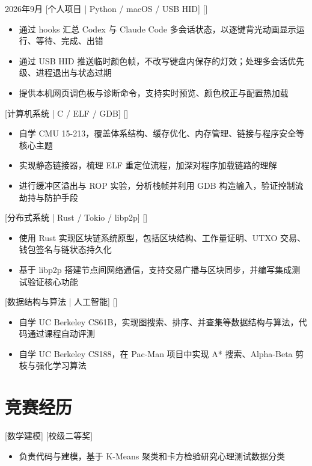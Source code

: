 \documentclass{cv}
\begin{document}
  {2026年9月}
  [个人项目 | Python / macOS / USB HID]
  []
  \begin{itemize}
    \item 通过 hooks 汇总 Codex 与 Claude Code 多会话状态，以逐键背光动画显示运行、等待、完成、出错
    \item 通过 USB HID 推送临时颜色帧，不改写键盘内保存的灯效；处理多会话优先级、进程退出与状态过期
    \item 提供本机网页调色板与诊断命令，支持实时预览、颜色校正与配置热加载
  \end{itemize}

  {}
  [计算机系统 | C / ELF / GDB]
  []
  \begin{itemize}
    \item 自学 CMU 15-213，覆盖体系结构、缓存优化、内存管理、链接与程序安全等核心主题
    \item 实现静态链接器，梳理 ELF 重定位流程，加深对程序加载链路的理解
    \item 进行缓冲区溢出与 ROP 实验，分析栈帧并利用 GDB 构造输入，验证控制流劫持与防护手段
  \end{itemize}

  {}
  [分布式系统 | Rust / Tokio / libp2p]
  []
  \begin{itemize}
    \item 使用 Rust 实现区块链系统原型，包括区块结构、工作量证明、UTXO 交易、钱包签名与链状态持久化
    \item 基于 libp2p 搭建节点间网络通信，支持交易广播与区块同步，并编写集成测试验证核心功能
  \end{itemize}

  {}
  [数据结构与算法 | 人工智能]
  []
  \begin{itemize}
    \item 自学 UC Berkeley CS61B，实现图搜索、排序、并查集等数据结构与算法，代码通过课程自动评测
    \item 自学 UC Berkeley CS188，在 Pac-Man 项目中实现 A* 搜索、Alpha-Beta 剪枝与强化学习算法
  \end{itemize}

\section{竞赛经历}
  {}
  [数学建模]
  [校级二等奖]
  \begin{itemize}
    \item 负责代码与建模，基于 K-Means 聚类和卡方检验研究心理测试数据分类
  \end{itemize}
\end{document}
